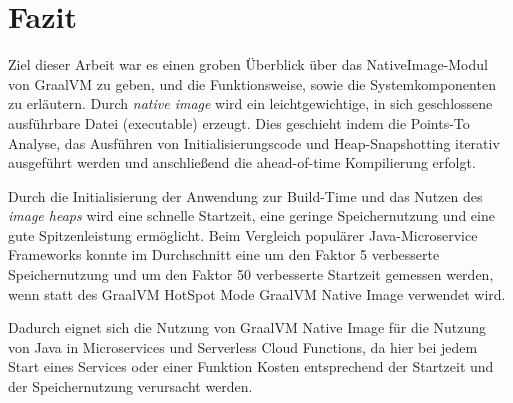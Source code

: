 \section{Fazit}
\label{sec:fazit}

Ziel dieser Arbeit war es einen groben Überblick über das NativeImage-Modul von GraalVM zu geben, und die Funktionsweise, sowie die Systemkomponenten zu erläutern. 
Durch \textit{native image} wird ein leichtgewichtige, in sich geschlossene ausführbare Datei (executable) erzeugt. Dies geschieht indem die Points-To Analyse, das Ausführen
von Initialisierungscode und Heap-Snapshotting iterativ ausgeführt werden und anschließend die ahead-of-time Kompilierung erfolgt.

Durch die Initialisierung der Anwendung zur Build-Time und das Nutzen des \textit{image heaps} wird eine schnelle Startzeit, eine geringe Speichernutzung und eine gute Spitzenleistung
ermöglicht. Beim Vergleich populärer Java-Microservice Frameworks konnte im Durchschnitt eine um den Faktor 5 verbesserte Speichernutzung
und um den Faktor 50 verbesserte Startzeit gemessen werden, wenn statt des GraalVM HotSpot Mode GraalVM Native Image verwendet wird.

Dadurch eignet sich die Nutzung von GraalVM Native Image für die Nutzung von Java in Microservices und Serverless Cloud Functions, da hier bei jedem Start eines Services oder einer Funktion 
Kosten entsprechend der Startzeit und der Speichernutzung verursacht werden. 
